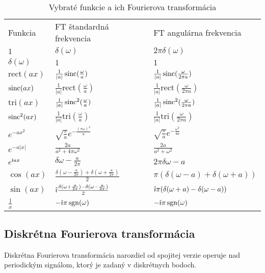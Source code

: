 \begin{table}[htp]
    \centering
    \begin{tabular}{lll}
    Funkcia&FT štandardná frekvencia&FT angulárna frekvencia\\
    $1$&$\delta(\omega)$&$2\pi\delta(\omega)$\\
    $\delta(\omega)$&$1$&$1$\\
    $\text{rect}(ax)$&$\frac{1}{|a|}\operatorname{sinc}(\frac{\omega}{a})$&
               $\frac{1}{|a|}\operatorname{sinc}(\frac{\omega}{2\pi a})$\\
    $\operatorname{sinc}(ax)$&$\frac{1}{|a|}\text{rect}(\frac{\omega}{a})$&
                $\frac{1}{|a|}\text{rect}(\frac{\omega}{2\pi a})$\\
    $\text{tri}(ax)$&$\frac{1}{|a|}\operatorname{sinc}^2(\frac{\omega}{a})$&
               $\frac{1}{|a|}\operatorname{sinc}^2(\frac{\omega}{2\pi a})$\\
    $\operatorname{sinc}^2(ax)$&$\frac{1}{|a|}\text{tri}(\frac{\omega}{a})$&
                $\frac{1}{|a|}\text{tri}(\frac{\omega}{2\pi a})$\\
    $e^{-ax^2}$&$\sqrt{\frac{\pi}{a}} e^{-\frac{(\pi\omega)^2}{a}}$&
                $\sqrt{\frac{\pi}{a}} e^{-\frac{\omega^2}{4a}}$\\
    $e^{-a|x|}$& $\frac{2a}{a^2 + 4\pi\omega^2}$&
                 $\frac{2a}{a^2 + \omega^2}$\\
    $e^{\hat{\imath} a x}$&$\delta{\omega-\frac{a}{2\pi}}$&
                 $2\pi\delta{\omega-a}$\\
    $\cos(ax)$&$\frac{\delta(\omega-\frac{a}{2\pi})+
                      \delta(\omega+\frac{a}{2\pi})}{2}$&
                $\pi (\delta(\omega-a)+\delta(\omega+a))$\\
    $\sin(ax)$&$\hat{\imath}\frac{\delta(\omega+\frac{a}{2\pi})-
                      \delta(\omega-\frac{a}{2\pi})}{2}$&
                $\hat{\imath}\pi (\delta(\omega+a)-\delta(\omega-a))$\\
    $\frac{1}{x}$&$-\hat{\imath}\pi\operatorname{sgn}(\omega)$&
                  $-\hat{\imath}\pi\operatorname{sgn}(\omega)$
    \end{tabular}
    \caption{Vybraté funkcie a ich Fourierova transformácia}
    \label{tab:fourier_transform_pairs}
\end{table}


\subsection{Diskrétna Fourierova transformácia}

Diskrétna Fourierova transformácia narozdiel od spojitej verzie operuje nad
periodickým signálom, ktorý je zadaný v diskrétnych bodoch.

